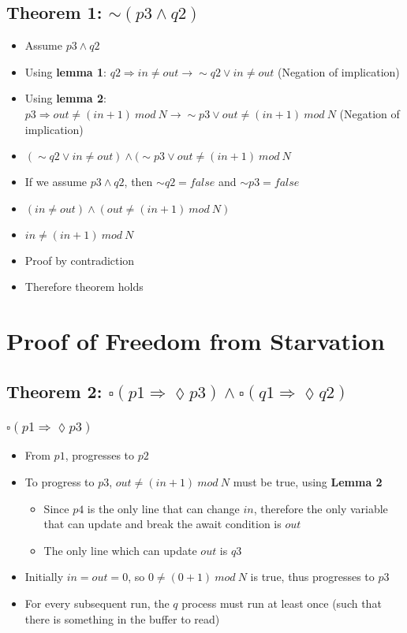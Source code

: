 \documentclass[12pt,a4paper]{article}
\begin{document}
\subsection*{\textbf{Theorem 1}: $\sim(p3 \wedge q2)$}
\begin{itemize}
    \item Assume $p3 \wedge q2$
    \item Using \textbf{lemma 1}: $q2 \Longrightarrow in \neq out \longrightarrow \sim q2 \vee in \neq out$ (Negation of implication)
    \item Using \textbf{lemma 2}: $p3 \Longrightarrow out \neq (in + 1)\ mod\ N \longrightarrow \sim p3 \vee out \neq (in + 1)\ mod\ N$ (Negation of implication)
    \item $(\sim q2 \vee in \neq out) \wedge (\sim p3 \vee out \neq (in + 1)\ mod\ N$
    \item If we assume $p3 \wedge q2$, then $\sim q2 = false$ and $\sim p3 = false$
    \item $(in \neq out) \wedge (out \neq (in + 1)\ mod\ N)$
    \item $in \neq (in + 1)\ mod\ N$
    \item Proof by contradiction
    \item Therefore theorem holds
\end{itemize}

\section{Proof of Freedom from Starvation}

\subsection*{\textbf{Theorem 2}: $\square(p1 \Longrightarrow \lozenge p3) \wedge \square(q1 \Longrightarrow \lozenge q2)$}

\subsubsection*{$\square (p1 \Longrightarrow \lozenge p3)$}
\begin{itemize}
    \item From $p1$, progresses to $p2$
    \item To progress to $p3$, $out \neq (in+1)\ mod\ N$ must be true, using \textbf{Lemma 2}
    \begin{itemize}
        \item Since $p4$ is the only line that can change $in$, therefore the only variable that can update and break the await condition is $out$
        \item The only line which can update $out$ is $q3$
    \end{itemize}
    \item Initially $in = out = 0$, so $0 \neq (0+1)\ mod\ N$ is true, thus progresses to $p3$
    \item For every subsequent run, the $q$ process must run at least once (such that there is something in the buffer to read)
\end{itemize}
\end{document}
